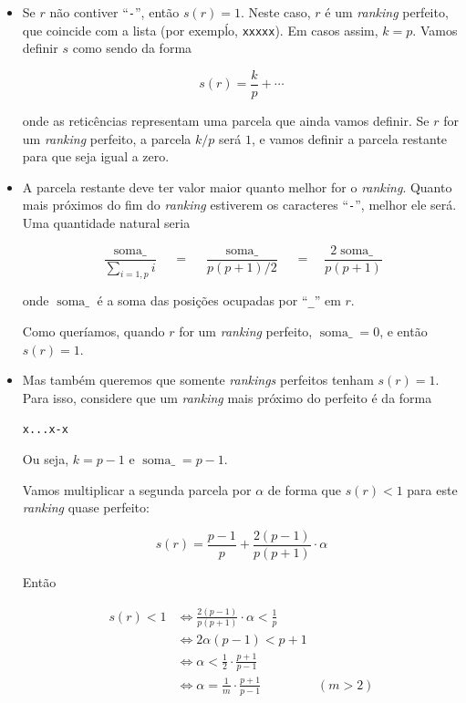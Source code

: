 \documentclass[
  letterpaper,
  DIV=11,
  numbers=noendperiod]{scrreprt}
\begin{document}
\begin{itemize}
\item
  Se $r$ não contiver ``\texttt{-}'', então $s(r) = 1$. Neste caso, $r$
  é um \emph{ranking} perfeito, que coincide com a lista (por exempĺo,
  \texttt{xxxxx}). Em casos assim, $k = p$. Vamos definir $s$ como sendo
  da forma

  \[
  s(r) = \frac k p + \cdots
  \]

  onde as reticências representam uma parcela que ainda vamos definir.
  Se $r$ for um \emph{ranking} perfeito, a parcela $k/p$ será $1$, e
  vamos definir a parcela restante para que seja igual a zero.
\item
  A parcela restante deve ter valor maior quanto melhor for o
  \emph{ranking}. Quanto mais próximos do fim do \emph{ranking}
  estiverem os caracteres ``\texttt{-}'', melhor ele será. Uma
  quantidade natural seria

  \[
  \frac{\operatorname{soma\_}}{\sum_{i = 1, p}i} 
  \quad=\quad 
  \frac{\operatorname{soma\_}}{p(p + 1) / 2}
  \quad=\quad 
  \frac{2\operatorname{soma\_}}{p(p + 1)}
  \]

  onde $\operatorname{soma\_}$ é a soma das posições ocupadas por
  ``\texttt{\_}'' em $r$.

  Como queríamos, quando $r$ for um \emph{ranking} perfeito,
  $\operatorname{soma\_} = 0$, e então $s(r) = 1$.
\item
  Mas também queremos que somente \emph{rankings} perfeitos tenham
  $s(r) = 1$. Para isso, considere que um \emph{ranking} mais próximo do
  perfeito é da forma

  \texttt{x...x-x}

  Ou seja, $k = p - 1$ e $\operatorname{soma\_} = p - 1$.

  Vamos multiplicar a segunda parcela por $\alpha$ de forma que
  $s(r) < 1$ para este \emph{ranking} quase perfeito:

  \[
  s(r) = \frac{p-1}{p} + \frac{2(p-1)}{p(p+1)} \cdot \alpha
  \]

  Então

  \[
  \begin{aligned}
    s(r) < 1 
    &\iff \frac{2(p-1)}{p(p+1)} \cdot \alpha < \frac1p \\
    &\iff 2 \alpha (p - 1) < p + 1 \\
    &\iff \alpha < \frac12 \cdot \frac{p + 1}{p - 1} \\
    &\iff \alpha = \frac1m \cdot \frac{p + 1}{p - 1} & (m > 2)
  \end{aligned}
  \]


\end{itemize}
\end{document}
